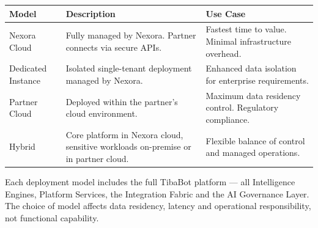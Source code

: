 \begin{center}

\renewcommand{\arraystretch}{1.5}

\begin{tabularx}{\textwidth}{|Y|Y|Y|}

\hline


\textbf{Model} &

\textbf{Description} &

\textbf{Use Case} \\

\hline

Nexora Cloud &

Fully managed by Nexora. Partner connects via secure APIs. &

Fastest time to value. Minimal infrastructure overhead. \\

\hline

Dedicated Instance &

Isolated single-tenant deployment managed by Nexora. &

Enhanced data isolation for enterprise requirements. \\

\hline

Partner Cloud &

Deployed within the partner's cloud environment. &

Maximum data residency control. Regulatory compliance. \\

\hline

Hybrid &

Core platform in Nexora cloud, sensitive workloads on-premise or in partner cloud. &

Flexible balance of control and managed operations. \\

\hline

\end{tabularx}

\end{center}

Each deployment model includes the full TibaBot platform — all Intelligence Engines, Platform Services, the Integration Fabric and the AI Governance Layer. The choice of model affects data residency, latency and operational responsibility, not functional capability.


